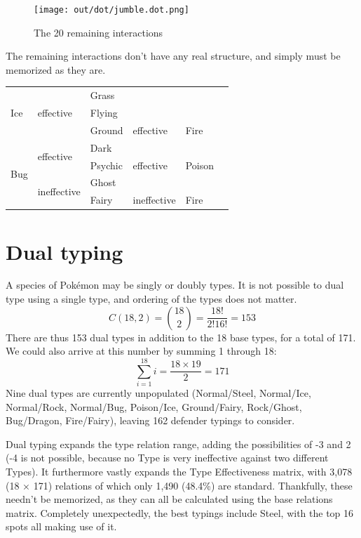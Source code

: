 \begin{figure}[ht]
\centering
\texttt{[image: out/dot/jumble.dot.png]}
\caption{The 20 remaining interactions}
\end{figure}
The remaining interactions don't have any real structure, and simply must be
memorized as they are.

\begin{table}[ht]
  \begin{center}
    \begin{tabular}{llllll}
      \multirow{3}{*}{Ice} & \multirow{3}{*}{effective} & Grass & & \\
      & & Flying & & \\
      & & Ground & effective & Fire \\
      \multirow{4}{*}{Bug} & \multirow{2}{*}{effective} & Dark & & \\
      & & Psychic & effective & Poison \\
      & \multirow{2}{*}{ineffective} & Ghost \\
      & & Fairy & ineffective & Fire \\
    \end{tabular}
  \end{center}
\end{table}

\section{Dual typing}
\label{section:dualtypes}
A species of Pokémon may be singly or doubly types.
It is not possible to dual type using a single type,
 and ordering of the types does not matter.
\[ C(18, 2) = \binom{18}{2} = \frac{18!}{2!16!} = 153 \]
There are thus 153 dual types in addition to the 18 base types,
  for a total of 171.
We could also arrive at this number by summing 1 through 18:
\[ \sum_{i=1}^{18} i = \frac{18 \times 19}{2} = 171 \]
Nine dual types are currently unpopulated (Normal/Steel, Normal/Ice, Normal/Rock,
 Normal/Bug, Poison/Ice, Ground/Fairy, Rock/Ghost, Bug/Dragon, Fire/Fairy),
 leaving 162 defender typings to consider.

Dual typing expands the type relation range, adding the possibilities
 of -3 and 2 (-4 is not possible, because no Type is very ineffective against
 two different Types).
It furthermore vastly expands the Type Effectiveness matrix,
 with 3,078 (18 × 171) relations of which only 1,490 (48.4\%) are standard.
Thankfully, these needn't be memorized, as they can all be calculated
 using the base relations matrix.
Completely unexpectedly, the best typings include Steel, with the top 16
 spots all making use of it.

